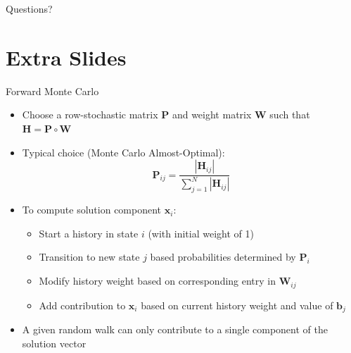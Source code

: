 \documentclass{beamer}
\begin{document}

\begin{frame}
\vfill
\centering
\huge Questions?
\vfill
\end{frame}

\section*{Extra Slides}

\begin{frame}{Forward Monte Carlo}
\begin{itemize}
  \item Choose a row-stochastic matrix $\mathbf{P}$ and weight matrix
    $\mathbf{W}$ such that $\mathbf{H} = \mathbf{P} \circ \mathbf{W}$
  \item Typical choice (Monte Carlo Almost-Optimal):
    \begin{equation*}
      \mathbf{P}_{ij} = \frac{| \mathbf{H}_{ij}| }
      {\sum_{j=1}^{N} | \mathbf{H}_{ij} | }
    \end{equation*}
  \item To compute solution component $\mathbf{x}_i$:
    \begin{itemize}
      \item Start a history in state $i$ (with initial weight of 1)
      \item Transition to new state $j$ based probabilities determined by
        $\mathbf{P}_i$
      \item Modify history weight based on corresponding entry in
        $\mathbf{W}_{ij}$
      \item Add contribution to $\mathbf{x}_i$ based on current history weight
        and value of $\mathbf{b}_j$
    \end{itemize}
  \item A given random walk can only contribute to a single component of
    the solution vector
\end{itemize}
\end{frame}

\end{document}
